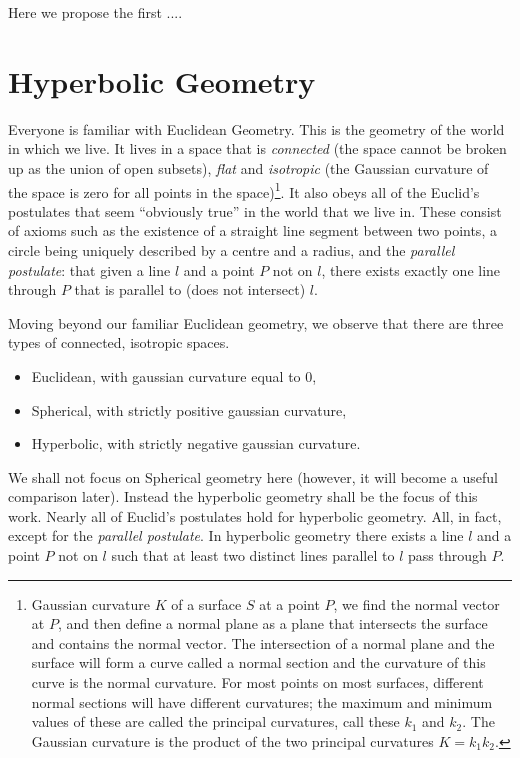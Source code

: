 \documentclass{article}
\begin{document}
	Here we propose the first ....
		
\section{Hyperbolic Geometry}
	
Everyone is familiar with Euclidean Geometry.
This is the geometry of the world in which we live.
It lives in a space that is \textit{connected} (the space cannot be broken up as the union of open subsets), \textit{flat} and \textit{isotropic} (the Gaussian curvature of the space is zero for all points in the space)\footnote{Gaussian curvature $K$ of a surface $S$ at a point $P$, we find the normal vector at $P$, and then define a normal plane as a plane that intersects the surface and contains the normal vector. The intersection of a normal plane and the surface will form a curve called a normal section and the curvature of this curve is the normal curvature. For most points on most surfaces, different normal sections will have different curvatures; the maximum and minimum values of these are called the principal curvatures, call these $k_1$ and $k_2$. The Gaussian curvature is the product of the two principal curvatures $K=k_1 k_2$.}.
It also obeys all of the Euclid's postulates that seem ``obviously true'' in the world that we live in.
These consist of axioms such as the existence of a straight line segment between two points, a circle being uniquely described by a centre and a radius, and the \textit{parallel postulate}: that given a line $l$ and a point $P$ not on $l$, there exists exactly one line through $P$ that is parallel to (does not intersect) $l$.

Moving beyond our familiar Euclidean geometry, we observe that there are three types of connected, isotropic spaces.
\begin{itemize}
	\item Euclidean, with gaussian curvature equal to 0,
	\item Spherical, with strictly positive gaussian curvature,
	\item Hyperbolic, with strictly negative gaussian curvature.
\end{itemize}

We shall not focus on Spherical geometry here (however, it will become a useful comparison later).
Instead the hyperbolic geometry shall be the focus of this work.
Nearly all of Euclid's postulates hold for hyperbolic geometry.
All, in fact, except for the \textit{parallel postulate}.
In hyperbolic geometry there exists a line $ l$ and a point $ P$ not on $ l$ such that at least two distinct lines parallel to $ l$ pass through $P$.
\end{document}
